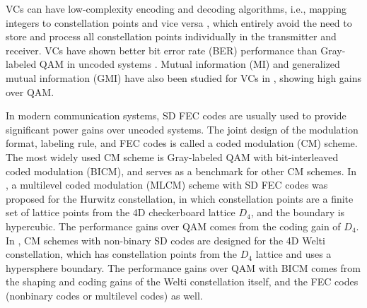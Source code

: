 \documentclass[journal]{IEEEtran}
\begin{document}
VCs can have low-complexity encoding and decoding algorithms, i.e., mapping integers to constellation points and vice versa \cite{conway83,conway82decoding,feng13,ferdinandTWC,kurkoski18}, which entirely avoid the need to store and process all constellation points individually in the transmitter and receiver. VCs have shown better bit error rate (BER) performance than Gray-labeled QAM in uncoded systems \cite{ourISIT,ourjlt,alijlt20,aliecoc21,aliecoc22}. Mutual information (MI) and generalized mutual information (GMI) have also been studied for VCs in \cite{ourTC,ourjlt}, showing high gains over QAM. 

In modern communication systems, SD FEC codes are usually used to provide significant power gains over uncoded systems. The joint design of the modulation format, labeling rule, and FEC codes is called a coded modulation (CM) scheme. The most widely used CM scheme is Gray-labeled QAM with bit-interleaved coded modulation (BICM), and serves as a benchmark for other CM schemes. In \cite{frey20}, a multilevel coded modulation (MLCM) scheme with SD FEC codes was proposed for the Hurwitz constellation, in which constellation points are a finite set of lattice points from the 4D checkerboard lattice $D_4$, and the boundary is hypercubic. The performance gains over QAM comes from the coding gain of $D_4$. In \cite{stern20, stern21}, CM schemes with non-binary SD codes are designed for the 4D Welti constellation, which has constellation points from the $D_4$ lattice and uses a hypersphere boundary. The performance gains over QAM with BICM comes from the shaping and coding gains of the Welti constellation itself, and the FEC codes (nonbinary codes or multilevel codes) as well. 
\end{document}
